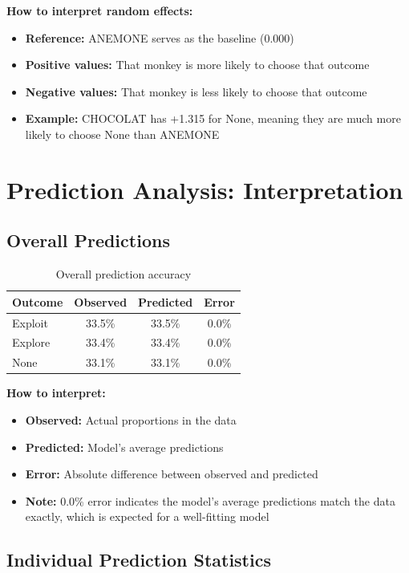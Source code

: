 \documentclass[11pt]{article}
\begin{document}
\textbf{How to interpret random effects:}
\begin{itemize}
    \item \textbf{Reference:} ANEMONE serves as the baseline (0.000)
    \item \textbf{Positive values:} That monkey is more likely to choose that outcome
    \item \textbf{Negative values:} That monkey is less likely to choose that outcome
    \item \textbf{Example:} CHOCOLAT has +1.315 for None, meaning they are much more likely to choose None than ANEMONE
\end{itemize}

\section{Prediction Analysis: Interpretation}

\subsection{Overall Predictions}

\begin{table}[h]
\centering
\begin{tabular}{lccc}
\toprule
\textbf{Outcome} & \textbf{Observed} & \textbf{Predicted} & \textbf{Error} \\
\midrule
Exploit & 33.5\% & 33.5\% & 0.0\% \\
Explore & 33.4\% & 33.4\% & 0.0\% \\
None & 33.1\% & 33.1\% & 0.0\% \\
\bottomrule
\end{tabular}
\caption{Overall prediction accuracy}
\end{table}

\textbf{How to interpret:}
\begin{itemize}
    \item \textbf{Observed:} Actual proportions in the data
    \item \textbf{Predicted:} Model's average predictions
    \item \textbf{Error:} Absolute difference between observed and predicted
    \item \textbf{Note:} 0.0\% error indicates the model's average predictions match the data exactly, which is expected for a well-fitting model
\end{itemize}

\subsection{Individual Prediction Statistics}
\end{document}
